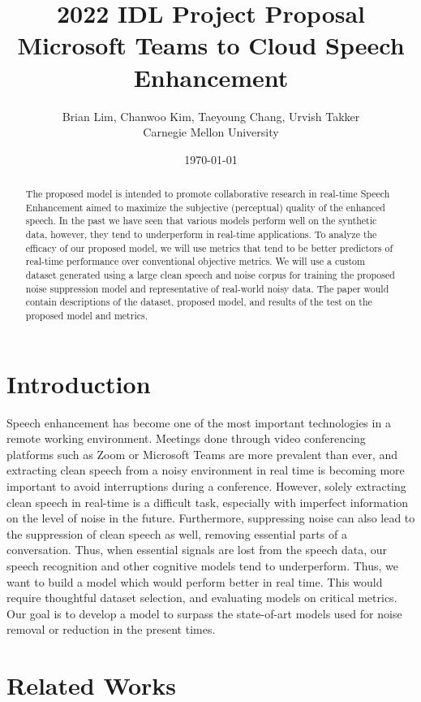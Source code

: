 \documentclass[11pt]{article}
\title{2022 IDL Project Proposal \\ \vspace{0.5cm} \large \textbf{Microsoft Teams to Cloud Speech Enhancement}}
\author{Brian Lim, Chanwoo Kim, Taeyoung Chang, Urvish Takker \\ Carnegie Mellon University}
\date{\today}
\date{}
\begin{document}

\maketitle

\begin{abstract}
    The proposed model is intended to promote collaborative research in real-time Speech Enhancement aimed to maximize the subjective (perceptual) quality of the enhanced speech. In the past we have seen that various models perform well on the synthetic data, however, they tend to underperform in real-time applications. To analyze the efficacy of our proposed model, we will use metrics that tend to be better predictors of real-time performance over conventional objective metrics. We will use a custom dataset generated using a large clean speech and noise corpus for training the proposed noise suppression model and representative of real-world noisy data. The paper would contain descriptions of the dataset, proposed model, and results of the test on the proposed model and metrics.
\end{abstract}


\section{Introduction}
Speech enhancement has become one of the most important technologies in a remote working environment. Meetings done through video conferencing platforms such as Zoom or Microsoft Teams are more prevalent than ever, and extracting clean speech from a noisy environment in real time is becoming more important to avoid interruptions during a conference. However, solely extracting clean speech in real-time is a difficult task, especially with imperfect information on the level of noise in the future. Furthermore, suppressing noise can also lead to the suppression of clean speech as well, removing essential parts of a conversation. Thus, when essential signals are lost from the speech data, our speech recognition and other cognitive models tend to underperform. Thus, we want to build a model which would perform better in real time. This would require thoughtful dataset selection, and evaluating models on critical metrics. Our goal is to develop a model to surpass the state-of-art models used for noise removal or reduction in the present times.


\section{Related Works}
\end{document}
